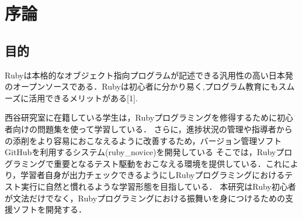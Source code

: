 \section{序論}
\subsection{目的}
Rubyは本格的なオブジェクト指向プログラムが記述できる汎用性の高い日本発のオープンソースである．Rubyは初心者に分かり易く,プログラム教育にもスムーズに活用できるメリットがある[1].

西谷研究室に在籍している学生は，Rubyプログラミングを修得するために初心者向けの問題集を使って学習している．
さらに，進捗状況の管理や指導者からの添削をより容易におこなえるように改善するため，バージョン管理ソフトGitHubを利用するシステム(ruby\_novice)を開発している
そこでは，Rubyプログラミングで重要となるテスト駆動をおこなえる環境を提供している．これにより，学習者自身が出力チェックできるようにしRubyプログラミングにおけるテスト実行に自然と慣れるような学習形態を目指している．
本研究はRuby初心者が文法だけでなく，Rubyプログラミングにおける振舞いを身につけるための支援ソフトを開発する．

